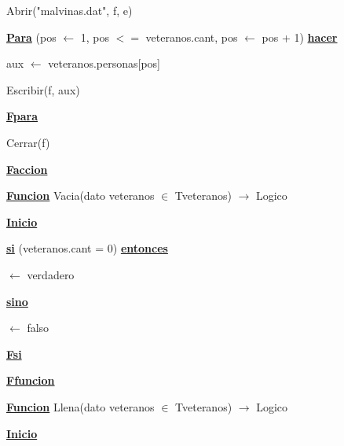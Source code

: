 \documentclass{article}
\begin{document}
            \hspace{12mm}Abrir("malvinas.dat", f, e)

            \hspace{12mm}\underline{\textbf{Para}} (pos $\leftarrow$ 1, pos $<=$ veteranos.cant, pos $\leftarrow$ pos + 1) \underline{\textbf{hacer}}

                \hspace{16mm}aux $\leftarrow$ veteranos.personas[pos]

                \hspace{16mm}Escribir(f, aux)

            \hspace{12mm}\underline{\textbf{Fpara}}

            \hspace{12mm}Cerrar(f)

    \hspace{4mm}\underline{\textbf{Faccion}}

    \vspace{4mm}

    \hspace{4mm}\underline{\textbf{Funcion}} Vacia(dato veteranos $\in$ Tveteranos) $\rightarrow$ Logico

        \hspace{8mm}\underline{\textbf{Inicio}}

            \hspace{12mm}\underline{\textbf{si}} (veteranos.cant = 0) \underline{\textbf{entonces}}

                \hspace{16mm}$\leftarrow$ verdadero

            \hspace{12mm}\underline{\textbf{sino}}

                \hspace{16mm}$\leftarrow$ falso

        \hspace{12mm}\underline{\textbf{Fsi}}

    \hspace{4mm}\underline{\textbf{Ffuncion}}

    \vspace{4mm}

    \hspace{4mm}\underline{\textbf{Funcion}} Llena(dato veteranos $\in$ Tveteranos) $\rightarrow$ Logico

        \hspace{8mm}\underline{\textbf{Inicio}}
\end{document}
